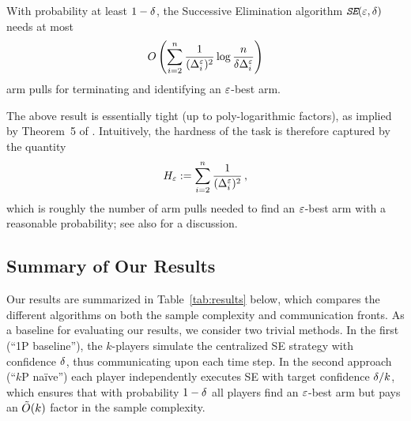 \documentclass[12pt]{article}
\begin{document}




\begin{theorem} \label{thm:sebound}
With probability at least $1-\delta$, the Successive Elimination algorithm $\emph{\texttt{SE}}(\varepsilon,\delta)$ needs at most
\begin{align} \label{eq:se_bound}
	O\left(
		\sum_{i=2}^{n} \frac{1}{(\Delta^{\varepsilon}_i)^2} \log \frac{n}{\delta \Delta^{\varepsilon}_i}
	\right)
\end{align}
arm pulls for terminating and identifying an $\varepsilon$-best arm.
\end{theorem}

The above result is essentially tight (up to poly-logarithmic factors), as implied by Theorem~5 of \citet{mannor04}.
Intuitively, the hardness of the task is therefore captured by the quantity
\begin{align} \label{eq:H}
	H_\varepsilon :=
	\sum_{i=2}^{n} \frac{1}{(\Delta^{\varepsilon}_i)^2} \,,
\end{align}
which is roughly the number of arm pulls needed to find an $\varepsilon$-best arm with a reasonable probability; see also \cite{audibert10} for a discussion.




\subsection{Summary of Our Results}

Our results are summarized in Table~\ref{tab:results} below, which compares the different algorithms on both the sample complexity and communication fronts.
As a baseline for evaluating our results, we consider two trivial methods. In the first (``1P baseline''), the $k$-players simulate the centralized SE strategy with confidence $\delta$, thus communicating upon each time step.
In the second approach (``$k$P na\"ive'') each player independently executes SE with target confidence $\delta/k$, which ensures that with probability $1-\delta$ all players find an $\varepsilon$-best arm but pays an $\tilde{O}(k)$ factor in the sample complexity.
\end{document}
